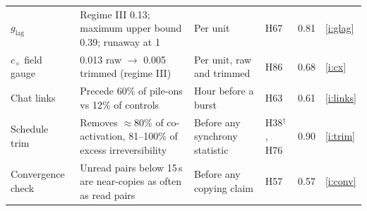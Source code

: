 \documentclass[aps,pre,reprint,10pt,nofootinbib]{revtex4-2}
\begin{document}
\begin{table}[p]
\begin{ruledtabular}
\begin{tabular}{p{}p{}p{}p{}ll}
\raggedright $g_{\text{lag}}$ & \raggedright Regime III 0.13; maximum upper bound 0.39; runaway at 1 & \raggedright Per unit & \raggedright H67 & 0.81 & \ref{i:glag} \tabularnewline
\raggedright $c_\times$ field gauge & \raggedright 0.013 raw $\to$ 0.005 trimmed (regime III) & \raggedright Per unit, raw and trimmed & \raggedright H86 & 0.68 & \ref{i:cx} \tabularnewline
\raggedright Chat links & \raggedright Precede 60\% of pile-ons vs 12\% of controls & \raggedright Hour before a burst & \raggedright H63 & 0.61 & \ref{i:links} \tabularnewline
\raggedright Schedule trim & \raggedright Removes $\approx80\%$ of co-activation, 81--100\% of excess irreversibility & \raggedright Before any synchrony statistic & \raggedright H38$^\dagger$, H76 & 0.90 & \ref{i:trim} \tabularnewline
\raggedright Convergence check & \raggedright Unread pairs below 15\,s are near-copies as often as read pairs & \raggedright Before any copying claim & \raggedright H57 & 0.57 & \ref{i:conv} \tabularnewline
\end{tabular}
\end{ruledtabular}
\end{table}
\end{document}
